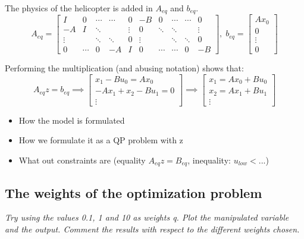 \documentclass[../main.tex]{subfiles}
\begin{document}
The physics of the helicopter is added in $A_{eq}$ and $b_{eq}$.
\begin{equation}
	A_{eq} = 
	\begin{bmatrix}
		I & 0 & \cdots & \cdots & 0 & -B & 0 & \cdots & \cdots & 0 \\
		-A & I & \ddots & & \vdots & 0 & \ddots & \ddots & & \vdots \\
		\vdots && \ddots & \ddots & 0 & \vdots & & \ddots & \ddots & 0 \\
		0 & \cdots & 0 & -A & I & 0 & \cdots & \cdots & 0 & -B
	\end{bmatrix}, \; 
	b_{eq} =
	\begin{bmatrix}
		Ax_0 \\ 0 \\ \vdots \\ 0
	\end{bmatrix}
\end{equation}

Performing the multiplication (and abusing notation) shows that:
\begin{equation}
	A_{eq}z = b_{eq} \implies
	\begin{bmatrix}
		x_1-Bu_0 = Ax_0 \\
		-Ax_1 + x_2 - Bu_1 = 0 \\
		\vdots
	\end{bmatrix} \implies
	\begin{bmatrix}
		x_1 = Ax_0 + Bu_0 \\
		x_2 = Ax_1 + Bu_1 \\
		\vdots
	\end{bmatrix}
\end{equation}

\begin{itemize}
	\item How the model is formulated
	\item How we formulate it as a QP problem with z
	\item What out constraints are (equality $ A_{eq} z = B_{eq} $, inequality: $ u_{low} < ... $)
\end{itemize}

\subsection{The weights of the optimization problem}
\textit{Try using the values 0.1, 1 and 10 as weights q. Plot the manipulated variable and the output. Comment the results with respect to the different weights chosen.}
\end{document}

